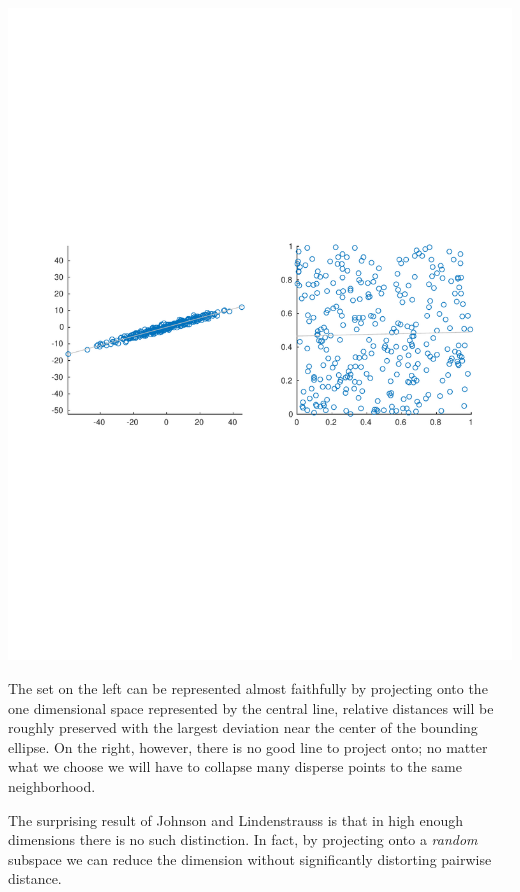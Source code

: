 \documentclass[11pt]{article}
\begin{document}
\begin{center}
    \includegraphics[trim=0 280 0 280, clip, width=\textwidth]{2dplots.pdf}
\end{center}

The set on the left can be represented almost faithfully by projecting onto the one dimensional space represented by the central line, relative distances will be roughly preserved with the largest deviation near the center of the bounding ellipse. On the right, however, there is no good line to project onto; no matter what we choose we will have to collapse many disperse points to the same neighborhood. 

The surprising result of Johnson and Lindenstrauss \cite{oldpaper} is that in high enough dimensions there is no such distinction. In fact, by projecting onto a \textit{random} subspace we can reduce the dimension without significantly distorting pairwise distance.
\end{document}
